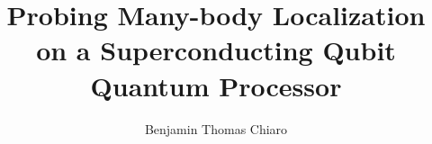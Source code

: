 \title{Probing Many-body Localization on a Superconducting Qubit Quantum Processor}
\author{Benjamin Thomas Chiaro}


